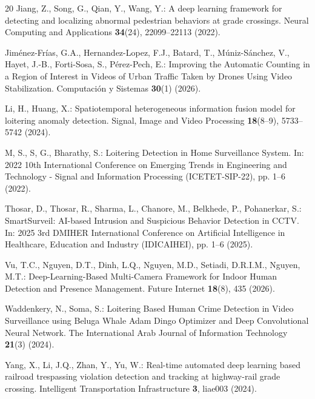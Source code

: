 \documentclass[runningheads]{llncs}
\begin{document}
\begin{thebibliography}{20}
Jiang, Z., Song, G., Qian, Y., Wang, Y.: A deep learning framework for detecting and localizing abnormal pedestrian behaviors at grade crossings. Neural Computing and Applications \textbf{34}(24), 22099--22113 (2022). 

Jiménez-Frías, G.A., Hernandez-Lopez, F.J., Batard, T., Múniz-Sánchez, V., Hayet, J.-B., Forti-Sosa, S., Pérez-Pech, E.: Improving the Automatic Counting in a Region of Interest in Videos of Urban Traffic Taken by Drones Using Video Stabilization. Computación y Sistemas \textbf{30}(1) (2026). 

Li, H., Huang, X.: Spatiotemporal heterogeneous information fusion model for loitering anomaly detection. Signal, Image and Video Processing \textbf{18}(8--9), 5733--5742 (2024). 

M, S., S, G., Bharathy, S.: Loitering Detection in Home Surveillance System. In: 2022 10th International Conference on Emerging Trends in Engineering and Technology - Signal and Information Processing (ICETET-SIP-22), pp. 1--6 (2022). 

Thosar, D., Thosar, R., Sharma, L., Chanore, M., Belkhede, P., Pohanerkar, S.: SmartSurveil: AI-based Intrusion and Suspicious Behavior Detection in CCTV. In: 2025 3rd DMIHER International Conference on Artificial Intelligence in Healthcare, Education and Industry (IDICAIHEI), pp. 1--6 (2025). 

Vu, T.C., Nguyen, D.T., Dinh, L.Q., Nguyen, M.D., Setiadi, D.R.I.M., Nguyen, M.T.: Deep-Learning-Based Multi-Camera Framework for Indoor Human Detection and Presence Management. Future Internet \textbf{18}(8), 435 (2026). 

Waddenkery, N., Soma, S.: Loitering Based Human Crime Detection in Video Surveillance using Beluga Whale Adam Dingo Optimizer and Deep Convolutional Neural Network. The International Arab Journal of Information Technology \textbf{21}(3) (2024). 

Yang, X., Li, J.Q., Zhan, Y., Yu, W.: Real-time automated deep learning based railroad trespassing violation detection and tracking at highway-rail grade crossing. Intelligent Transportation Infrastructure \textbf{3}, liae003 (2024). 


\end{thebibliography}
\end{document}
